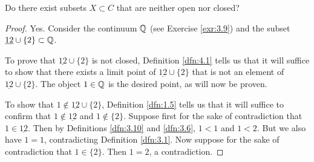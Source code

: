 \documentclass[../main.tex]{subfiles}
\begin{document}
\begin{exercise}\label{exr:4.15}
    Do there exist subsets $X\subset C$ that are neither open nor closed?
    \begin{proof}
        Yes. Consider the continuum $\mathbb{Q}$ (see Exercise \ref{exr:3.9}) and the subset $\underline{12}\cup\{2\}\subset\mathbb{Q}$.\par\smallskip
        To prove that $\underline{12}\cup\{2\}$ is not closed, Definition \ref{dfn:4.1} tells us that it will suffice to show that there exists a limit point of $\underline{12}\cup\{2\}$ that is not an element of $\underline{12}\cup\{2\}$. The object $1\in\mathbb{Q}$ is the desired point, as will now be proven.\par
        To show that $1\notin\underline{12}\cup\{2\}$, Definition \ref{dfn:1.5} tells us that it will suffice to confirm that $1\notin\underline{12}$ and $1\notin\{2\}$. Suppose first for the sake of contradiction that $1\in\underline{12}$. Then by Definitions \ref{dfn:3.10} and \ref{dfn:3.6}, $1<1$ and $1<2$. But we also have $1=1$, contradicting Definition \ref{dfn:3.1}. Now suppose for the sake of contradiction that $1\in\{2\}$. Then $1=2$, a contradiction.\par

\end{proof}
\end{exercise}
\end{document}
